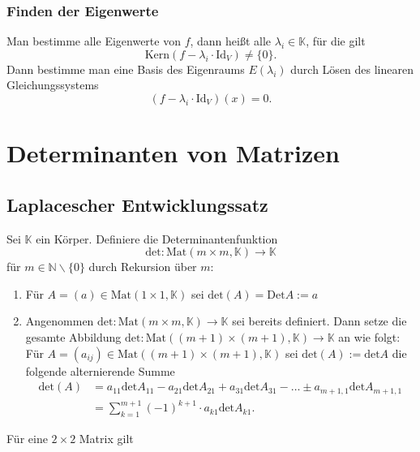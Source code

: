 \documentclass[a4paper,12pt]{article}
\begin{document}
\subsubsection{Finden der Eigenwerte}
Man bestimme alle Eigenwerte von $f$, dann heißt alle $\lambda _i \in \mathbb{K}$, für die gilt
\[ 
        \text{Kern}\left(f-\lambda _i\cdot \text{Id}_V\right)\neq \{0\}
.\] 
Dann bestimme man eine Basis des Eigenraums $E\left(\lambda _i\right)$ durch Lösen des linearen Gleichungssystems
\[ 
        \left(f-\lambda _i\cdot \text{Id}_V\right)\left(x\right)=0
.\] 

\section{Determinanten von Matrizen}

\subsection{Laplacescher Entwicklungssatz}
Sei $\mathbb{K}$ ein Körper. Definiere die Determinantenfunktion
\[ 
        \text{det}:\text{Mat}\left(m\times m,\mathbb{K}\right)\rightarrow \mathbb{K}
\] 
für $m \in \mathbb{N}\backslash\{0\}$ durch Rekursion über $m$:
\begin{enumerate}[label=(\alph*)]
        \item Für $A=\left(a\right) \in \text{Mat}\left(1\times 1,\mathbb{K}\right)$ sei $\text{det}\left(A\right)=\text{Det}A:=a$ 
        \item Angenommen $\text{det}:\text{Mat}\left(m\times m,\mathbb{K}\right)\rightarrow \mathbb{K}$ sei bereits definiert. Dann setze die gesamte Abbildung $\text{det}:\text{Mat}\left(\left(m+1\right)\times\left(m+1\right),\mathbb{K}\right)\rightarrow \mathbb{K}$ an wie folgt:\\Für $A=\left(a_{ij}\right) \in \text{Mat}\left(\left(m+1\right)\times\left(m+1\right),\mathbb{K}\right)$ sei $\text{det}\left(A\right):=\text{det}A$ die folgende alternierende Summe
                \begin{align*} 
                        \text{det}\left(A\right)&=a_{11}\text{det}A_{11}-a_{21}\text{det}A_{21}+a_{31}\text{det}A_{31}-\hdots \pm a_{m+1,1}\text{det}A_{m+1,1}\\
                                                &=\sum_{k=1}^{m+1}\left(-1\right)^{k+1}\cdot a_{k1}\text{det}A_{k1}
                .\end{align*}
\end{enumerate}
Für eine $2\times 2$ Matrix gilt
\end{document}
